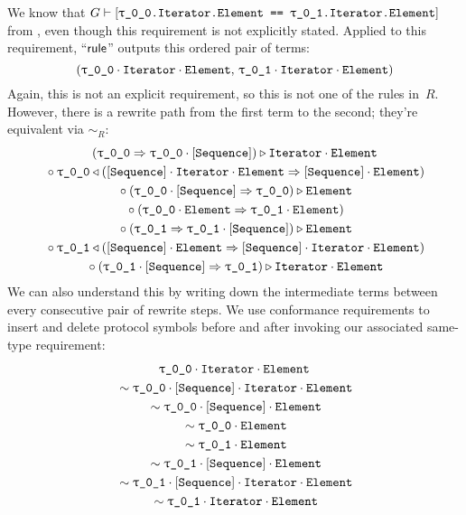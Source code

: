 \documentclass[../generics]{subfiles}
\begin{document}
\begin{example}
We know that $G\vdash\SameReq{\rT.Iterator.Element}{\rU.Iterator.Element}$ from , even though this requirement is not explicitly stated. Applied to this requirement, ``$\mathsf{rule}$'' outputs this ordered pair of terms:
\[ (\rT\cdot\nIterator\cdot\nElement,\, \rU\cdot\nIterator\cdot\nElement) \]
Again, this is not an explicit requirement, so this is not one of the rules in~$R$. However, there is a rewrite path from the first term to the second; they're equivalent via $\sim_R$:
\begin{gather*}
(\rT\Rightarrow\rT\cdot\pSequence)\WR\nIterator\cdot\nElement\\
{} \circ \rT\WL(\pSequence\cdot\nIterator\cdot\nElement\Rightarrow\pSequence\cdot\nElement)\\
{} \circ (\rT\cdot\pSequence\Rightarrow\rT)\WR\nElement\\
{} \circ (\rT\cdot\nElement\Rightarrow\rU\cdot\nElement)\\
{} \circ (\rU\Rightarrow\rU\cdot\pSequence)\WR\nElement\\
{} \circ \rU\WL(\pSequence\cdot\nElement\Rightarrow\pSequence\cdot\nIterator\cdot\nElement)\\
{} \circ (\rU\cdot\pSequence\Rightarrow\rU)\WR\nIterator\cdot\nElement
\end{gather*}
We can also understand this by writing down the intermediate terms between every consecutive pair of rewrite steps. We use conformance requirements to insert and delete protocol symbols before and after invoking our associated same-type requirement:
\begin{gather*}
\rT\cdot\nIterator\cdot\nElement\\
{} \sim \rT\cdot\pSequence\cdot\nIterator\cdot\nElement\\
{} \sim \rT\cdot\pSequence\cdot\nElement\\
{} \sim \rT\cdot\nElement\\
{} \sim \rU\cdot\nElement\\
{} \sim \rU\cdot\pSequence\cdot\nElement\\
{} \sim \rU\cdot\pSequence\cdot\nIterator\cdot\nElement\\
{} \sim \rU\cdot\nIterator\cdot\nElement
\end{gather*}


\end{example}
\end{document}
